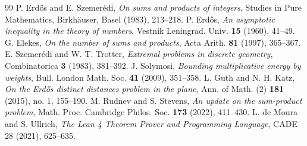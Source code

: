 \documentclass[11pt,a4paper]{article}
\theoremstyle{definition}
\begin{document}
\begin{thebibliography}{99}
 P. Erd\H{o}s and E. Szemer\'edi, \textit{On sums and products of integers}, Studies in Pure Mathematics, Birkh\"auser, Basel (1983), 213--218.
 P. Erd\H{o}s, \textit{An asymptotic inequality in the theory of numbers}, Vestnik Leningrad. Univ. \textbf{15} (1960), 41--49.
 G. Elekes, \textit{On the number of sums and products}, Acta Arith. \textbf{81} (1997), 365--367.
 E. Szemer\'edi and W. T. Trotter, \textit{Extremal problems in discrete geometry}, Combinatorica \textbf{3} (1983), 381--392.
 J. Solymosi, \textit{Bounding multiplicative energy by weights}, Bull. London Math. Soc. \textbf{41} (2009), 351--358.
 L. Guth and N. H. Katz, \textit{On the Erd\H{o}s distinct distances problem in the plane}, Ann. of Math. (2) \textbf{181} (2015), no. 1, 155--190.
 M. Rudnev and S. Stevens, \textit{An update on the sum-product problem}, Math. Proc. Cambridge Philos. Soc. \textbf{173} (2022), 411--430.
 L. de Moura and S. Ullrich, \textit{The Lean 4 Theorem Prover and Programming Language}, CADE 28 (2021), 625--635.
\end{thebibliography}
\end{document}
